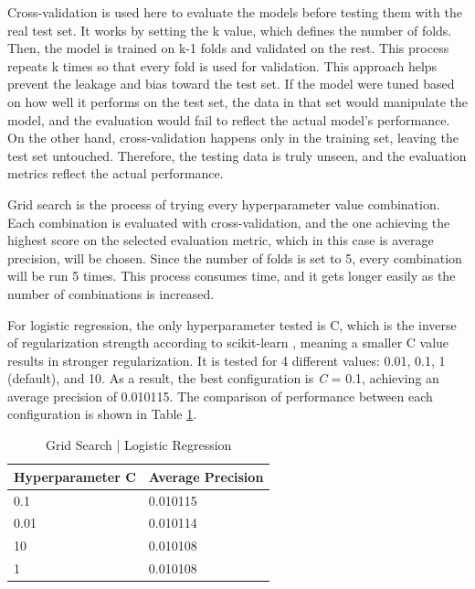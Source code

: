 \documentclass[ %
                    author={Natchalin Iwsakul \\ Inkaphol Siriwongwattana \\ Tanaphan Kummaraphat \\ Patorn Srisupap},
                supervisor={Fernando Moreno-Pino},
                    degree={MSc},
                     title={Propensity Modelling for SME Commercial Lending Using Open Public Data},
                  subtitle={Companies House filings and GDELT media coverage as predictors of first-time borrowing},
                      type={},
                      year={2026}]{dissertation}
\begin{document}
  Cross-validation is used here to evaluate the models before testing them with the real test set. It works by setting the k value, which defines the number of folds. Then, the model is trained on k-1 folds and validated on the rest. This process repeats k times so that every fold is used for validation. This approach helps prevent the leakage and bias toward the test set. If the model were tuned based on how well it performs on the test set, the data in that set would manipulate the model, and the evaluation would fail to reflect the actual model's performance. On the other hand, cross-validation happens only in the training set, leaving the test set untouched. Therefore, the testing data is truly unseen, and the evaluation metrics reflect the actual performance.

  Grid search is the process of trying every hyperparameter value combination. Each combination is evaluated with cross-validation, and the one achieving the highest score on the selected evaluation metric, which in this case is average precision, will be chosen. Since the number of folds is set to 5, every combination will be run 5 times. This process consumes time, and it gets longer easily as the number of combinations is increased. 

 
  For logistic regression, the only hyperparameter tested is C, which is the inverse of regularization strength according to scikit-learn \cite{Pedregosa_Scikit-learn_Machine_Learning_2011}, meaning a smaller C value results in stronger regularization. It is tested for 4 different values: 0.01, 0.1, 1 (default), and 10. As a result, the best configuration is \textit{C} = 0.1, achieving an average precision of 0.010115. The comparison of performance between each configuration is shown in Table \ref{gridsearchlogistic}. 

  \begin{table}[h]
      \centering
      \begin{tabular}{ll}
      \toprule
          Hyperparameter C & Average Precision \\
      \midrule
          0.1 & 0.010115 \\
          0.01 & 0.010114\\
          10 & 0.010108\\
          1 & 0.010108\\
      \bottomrule
      \end{tabular}
      \caption{Grid Search | Logistic Regression}
      \label{gridsearchlogistic}
  \end{table}
\end{document}

